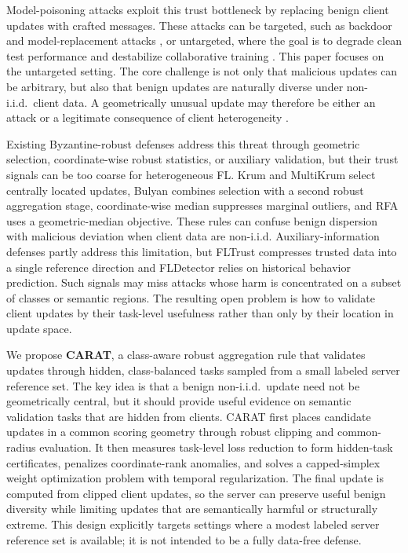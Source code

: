 \documentclass{article}
\begin{document}
Model-poisoning attacks exploit this trust bottleneck by replacing benign client updates with crafted messages. These attacks can be targeted, such as backdoor and model-replacement attacks \citep{bagdasaryan2020backdoor,xie2020dba,wang2020tails}, or untargeted, where the goal is to degrade clean test performance and destabilize collaborative training \citep{baruch2019alie,fang2020local,shejwalkar2021manipulating}. This paper focuses on the untargeted setting. The core challenge is not only that malicious updates can be arbitrary, but also that benign updates are naturally diverse under non-i.i.d.\ client data. A geometrically unusual update may therefore be either an attack or a legitimate consequence of client heterogeneity \citep{zhao2018noniid,li2020fedprox,karimireddy2020scaffold,zhu2021noniidsurvey}.

Existing Byzantine-robust defenses address this threat through geometric selection, coordinate-wise robust statistics, or auxiliary validation, but their trust signals can be too coarse for heterogeneous FL. Krum and MultiKrum \citep{blanchard2017krum} select centrally located updates, Bulyan \citep{elmhamdi2018bulyan} combines selection with a second robust aggregation stage, coordinate-wise median \citep{yin2018median} suppresses marginal outliers, and RFA \citep{pillutla2022rfa} uses a geometric-median objective. These rules can confuse benign dispersion with malicious deviation when client data are non-i.i.d. Auxiliary-information defenses partly address this limitation, but FLTrust \citep{cao2021fltrust} compresses trusted data into a single reference direction and FLDetector \citep{zhang2022fldetector} relies on historical behavior prediction. Such signals may miss attacks whose harm is concentrated on a subset of classes or semantic regions. The resulting open problem is how to validate client updates by their task-level usefulness rather than only by their location in update space.

We propose \textbf{CARAT}, a class-aware robust aggregation rule that validates updates through hidden, class-balanced tasks sampled from a small labeled server reference set. The key idea is that a benign non-i.i.d.\ update need not be geometrically central, but it should provide useful evidence on semantic validation tasks that are hidden from clients. CARAT first places candidate updates in a common scoring geometry through robust clipping and common-radius evaluation. It then measures task-level loss reduction to form hidden-task certificates, penalizes coordinate-rank anomalies, and solves a capped-simplex weight optimization problem with temporal regularization. The final update is computed from clipped client updates, so the server can preserve useful benign diversity while limiting updates that are semantically harmful or structurally extreme. This design explicitly targets settings where a modest labeled server reference set is available; it is not intended to be a fully data-free defense.
\end{document}

